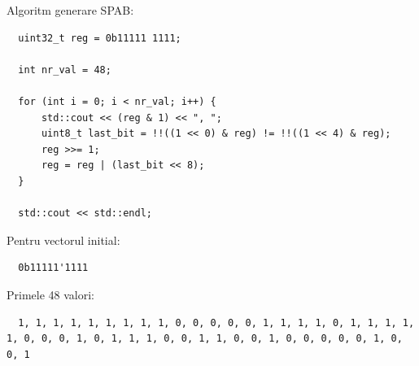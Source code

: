 \documentclass[12pt,english]{article}
\begin{document}
\begin{center}
\end{center}

Algoritm generare SPAB:
\begin{lstlisting}
  uint32_t reg = 0b11111 1111; 

  int nr_val = 48; 

  for (int i = 0; i < nr_val; i++) { 
      std::cout << (reg & 1) << ", "; 
      uint8_t last_bit = !!((1 << 0) & reg) != !!((1 << 4) & reg); 
      reg >>= 1; 
      reg = reg | (last_bit << 8); 
  } 

  std::cout << std::endl;
\end{lstlisting}

Pentru vectorul initial:
\begin{lstlisting}
  0b11111'1111
\end{lstlisting}

Primele 48 valori:
\begin{lstlisting}
  1, 1, 1, 1, 1, 1, 1, 1, 1, 0, 0, 0, 0, 0, 1, 1, 1, 1, 0, 1, 1, 1, 1, 1, 0, 0, 0, 1, 0, 1, 1, 1, 0, 0, 1, 1, 0, 0, 1, 0, 0, 0, 0, 0, 1, 0, 0, 1
\end{lstlisting}
\end{document}
